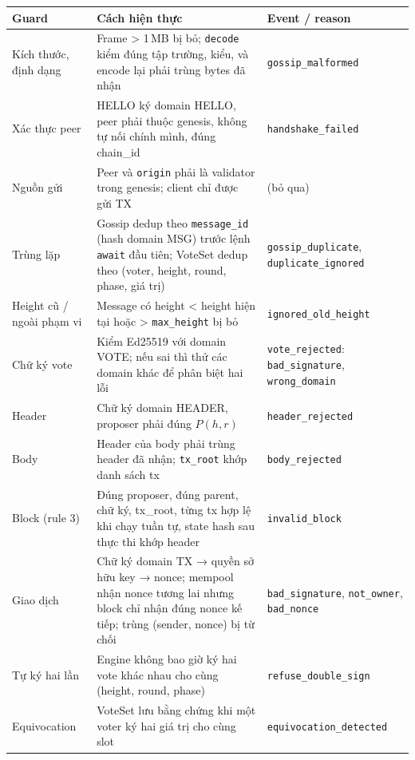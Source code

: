 \documentclass[11pt,a4paper]{article}
\newcommand{\code}[1]{\texttt{#1}}
\begin{document}
\begin{table}[H]
\centering\small
\renewcommand{\arraystretch}{1.08}
\begin{tabularx}{\linewidth}{@{}L{2.6cm} Y L{4.0cm}@{}}
\toprule
\textbf{Guard} & \textbf{Cách hiện thực} & \textbf{Event / reason} \\
\midrule
Kích thước, định dạng & Frame > 1\,MB bị bỏ; \code{decode} kiểm đúng tập trường, kiểu, và encode lại phải trùng bytes đã nhận & \code{gossip\_malformed} \\
Xác thực peer & HELLO ký domain HELLO, peer phải thuộc genesis, không tự nối chính mình, đúng chain\_id & \code{handshake\_failed} \\
Nguồn gửi & Peer và \code{origin} phải là validator trong genesis; client chỉ được gửi TX & (bỏ qua) \\
Trùng lặp & Gossip dedup theo \code{message\_id} (hash domain MSG) trước lệnh \code{await} đầu tiên; VoteSet dedup theo (voter, height, round, phase, giá trị) & \code{gossip\_duplicate}, \code{duplicate\_ignored} \\
Height cũ / ngoài phạm vi & Message có height < height hiện tại hoặc > \code{max\_height} bị bỏ & \code{ignored\_old\_height} \\
Chữ ký vote & Kiểm Ed25519 với domain VOTE; nếu sai thì thử các domain khác để phân biệt hai lỗi & \code{vote\_rejected}: \code{bad\_signature}, \code{wrong\_domain} \\
Header & Chữ ký domain HEADER, proposer phải đúng $P(h,r)$ & \code{header\_rejected} \\
Body & Header của body phải trùng header đã nhận; \code{tx\_root} khớp danh sách tx & \code{body\_rejected} \\
Block (rule 3) & Đúng proposer, đúng parent, chữ ký, tx\_root, từng tx hợp lệ khi chạy tuần tự, state hash sau thực thi khớp header & \code{invalid\_block} \\
Giao dịch & Chữ ký domain TX → quyền sở hữu key → nonce; mempool nhận nonce tương lai nhưng block chỉ nhận đúng nonce kế tiếp; trùng (sender, nonce) bị từ chối & \code{bad\_signature}, \code{not\_owner}, \code{bad\_nonce} \\
Tự ký hai lần & Engine không bao giờ ký hai vote khác nhau cho cùng (height, round, phase) & \code{refuse\_double\_sign} \\
Equivocation & VoteSet lưu bằng chứng khi một voter ký hai giá trị cho cùng slot & \code{equivocation\_detected} \\
\bottomrule
\end{tabularx}
\end{table}
\end{document}
